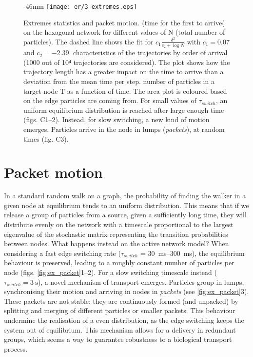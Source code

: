 \begin{figure}
  \begin{adjustwidth*}{}{-46mm}
    \texttt{[image: er/3\_extremes.eps]}%
    {{\label{fig:ex_efpt}}%
    {\label{fig:ex_traj}}%
    {\label{fig:ex_packet}}}%
    \caption{Extremes statistics and packet motion.
    \enskip {} (time for the first to arrive( on the hexagonal network for different values of N (total number of particles). The dashed line shows the fit for $c_1 \frac{\delta^2}{c_2 + \log N}$ with $c_1 = 0.07$ and $c_2 = -2.39$. \enskip characteristics of the trajectories by order of arrival (1000 out of 10⁴ trajectories are considered). The plot shows how the trajectory length has a greater impact on the time to arrive than a deviation from the mean time per step.
    \enskip number of particles in a target node T as a function of time. The area plot is coloured based on the edge particles are coming from. For small values of $\tau_{switch}$, an uniform equilibrium distribution is reached after large enough time (figs. C1--2). Instead, for slow switching, a new kind of motion emerges. Particles arrive in the node in lumps (\emph{packets}), at random times (fig. C3).\label{fig:ex}}
  \end{adjustwidth*}
\end{figure}

\section{Packet motion}

In a standard random walk on a graph, the probability of finding the walker in a given node at equilibrium tends to an uniform distribution. This means that if we release a group of particles from a source, given a sufficiently long time, they will distribute evenly on the network with a timescale proportional to the largest eigenvalue of the stochastic matrix representing the transition probabilities between nodes. What happens instead on the active network model? When considering a fast edge switching rate ($\tau_{switch}$ = \SIrange{30}{300}{\milli\second}), the equilibrium behaviour is preserved, leading to a roughly constant number of particles per node (figs. \ref{fig:ex_packet}1--2). For a slow switching timescale instead ($\tau_{switch} = \SI{3}{\second}$), a novel mechanism of transport emerges. Particles group in lumps, synchronising their motion and arriving in nodes in \emph{packets} (see \cref{fig:ex_packet}3). These packets are not stable: they are continuously formed (and unpacked) by splitting and merging of different particles or smaller packets. This behaviour undermine the realisation of a even distribution, as the edge switching keeps the system out of equilibrium. This mechanism allows for a delivery in redundant groups, which seems a way to guarantee robustness to a biological transport process.
